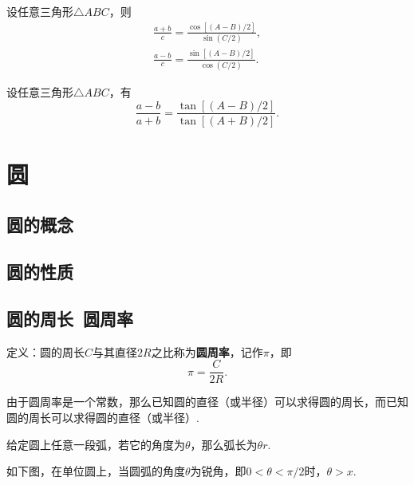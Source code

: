 \begin{theorem}[摩尔外德公式]
设任意三角形\(\triangle ABC\)，则\begin{gather}
\frac{a+b}{c}
= \frac{\cos[(A-B)/2]}{\sin(C/2)}, \\
\frac{a-b}{c}
= \frac{\sin[(A-B)/2]}{\cos(C/2)}.
\end{gather}
\end{theorem}

\begin{theorem}[正切定理]
设任意三角形\(\triangle ABC\)，有\begin{equation}
\frac{a-b}{a+b} = \frac{\tan[(A-B)/2]}{\tan[(A+B)/2]}.
\end{equation}
\end{theorem}

\section{圆}
\subsection{圆的概念}
\subsection{圆的性质}
\subsection{圆的周长\ 圆周率}
\begin{definition}
定义：圆的周长\(C\)与其直径\(2R\)之比称为\textbf{圆周率}，记作\(\pi\)，即\[
\pi = \frac{C}{2R}.
\]
\end{definition}
由于圆周率是一个常数，那么已知圆的直径（或半径）可以求得圆的周长，而已知圆的周长可以求得圆的直径（或半径）.

\begin{property}
给定圆上任意一段弧，若它的角度为\(\theta\)，那么弧长为\(\theta r\).
\end{property}

\begin{corollary}
如下图，在单位圆上，当圆弧的角度\(\theta\)为锐角，即\(0<\theta<\pi/2\)时，\(\theta > x\). \begin{center}
\end{center}
\end{corollary}

